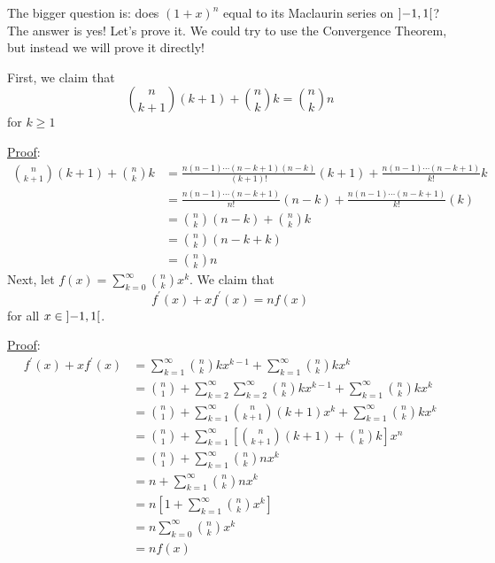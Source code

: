 The bigger question is: does $ (1+x)^n $ equal to its Maclaurin
series on $ \interval[open]{-1}{1} $? The answer is yes! Let's prove it.
We could try to use the Convergence Theorem, but instead we will prove it directly!

First, we claim that
\[ \binom{n}{k+1}(k+1)+\binom{n}{k}k=\binom{n}{k}n \]
for $ k\geqslant 1 $

\underline{Proof}:
\begin{align*}
    \binom{n}{k+1}(k+1)+\binom{n}{k}k
     & =\frac{n(n-1)\cdots(n-k+1)(n-k)}{(k+1)!}(k+1)
    +\frac{n(n-1)\cdots(n-k+1)}{k!}k                 \\
     & =\frac{n(n-1)\cdots(n-k+1)}{n!}(n-k)
    +\frac{n(n-1)\cdots(n-k+1)}{k!}(k)               \\
     & =\binom{n}{k}(n-k)+\binom{n}{k}k              \\
     & =\binom{n}{k}(n-k+k)                          \\
     & =\binom{n}{k}n
\end{align*}
Next, let $ f(x)=\sum\limits_{k=0}^{\infty} \binom{n}{k}x^k $. We claim that
\[ f^\prime(x)+xf^\prime(x)=nf(x) \]
for all $ x\in\interval[open]{-1}{1} $.

\underline{Proof}:
\begin{align*}
    f^\prime(x)+xf^\prime(x)
     & =\sum\limits_{k=1}^{\infty} \binom{n}{k}k x^{k-1}+\sum\limits_{k=1}^{\infty}\binom{n}{k}
    k x^k                                                                                       \\
     & =\binom{n}{1}+\sum\limits_{k=2}^{\infty} \sum\limits_{k=2}^{\infty}
    \binom{n}{k}k x^{k-1}+\sum\limits_{k=1}^{\infty} \binom{n}{k}k x^k                          \\
     & =\binom{n}{1}+
    \sum\limits_{k=1}^{\infty} \binom{n}{k+1}(k+1)x^k+
    \sum\limits_{k=1}^{\infty} \binom{n}{k}k x^k                                                \\
     & =\binom{n}{1}+\sum\limits_{k=1}^{\infty}
    \left[ \binom{n}{k+1}(k+1)+\binom{n}{k}k \right]x^n                                         \\
     & =\binom{n}{1}+\sum\limits_{k=1}^{\infty} \binom{n}{k}n x^k                               \\
     & =n+\sum\limits_{k=1}^{\infty}\binom{n}{k}n x^k                                           \\
     & =n\left[ 1+\sum\limits_{k=1}^{\infty} \binom{n}{k}x^k \right]                            \\
     & =n \sum\limits_{k=0}^{\infty} \binom{n}{k}x^k                                            \\
     & =n f(x)
\end{align*}

